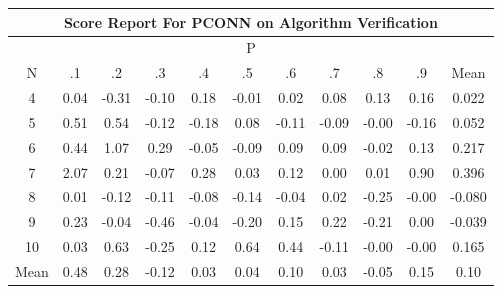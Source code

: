 \documentclass[11pt,a4paper]{report}
\begin{document}
\begin{longtable}{ | c || c | c | c | c | c | c | c | c | c || c |}
\hline
\multicolumn{11}{|c|}{ Score Report For PCONN on Algorithm Verification} \\
\hline
\multicolumn{11}{|c|}{ P } \\
\hline
N & .1 & .2 & .3 & .4 & .5 & .6 & .7 & .8 & .9 & Mean\\
 \hline
 \hline
 \endhead
  4 &  \cellcolor[HTML]{FFFFFF} 0.04 &  \cellcolor[HTML]{FFF7F7} -0.31 &  \cellcolor[HTML]{FFFFFF} -0.10 &  \cellcolor[HTML]{F7F7FF} 0.18 &  \cellcolor[HTML]{FFFFFF} -0.01 &  \cellcolor[HTML]{FFFFFF} 0.02 &  \cellcolor[HTML]{FFFFFF} 0.08 &  \cellcolor[HTML]{FFFFFF} 0.13 &  \cellcolor[HTML]{F7F7FF} 0.16 & 0.022 \\
  5 &  \cellcolor[HTML]{EFEFFF} 0.51 &  \cellcolor[HTML]{EFEFFF} 0.54 &  \cellcolor[HTML]{FFFFFF} -0.12 &  \cellcolor[HTML]{FFF7F7} -0.18 &  \cellcolor[HTML]{FFFFFF} 0.08 &  \cellcolor[HTML]{FFFFFF} -0.11 &  \cellcolor[HTML]{FFFFFF} -0.09 &  \cellcolor[HTML]{FFFFFF} -0.00 &  \cellcolor[HTML]{FFF7F7} -0.16 & 0.052 \\
  6 &  \cellcolor[HTML]{F7F7FF} 0.44 &  \cellcolor[HTML]{E7E7FF} 1.07 &  \cellcolor[HTML]{F7F7FF} 0.29 &  \cellcolor[HTML]{FFFFFF} -0.05 &  \cellcolor[HTML]{FFFFFF} -0.09 &  \cellcolor[HTML]{FFFFFF} 0.09 &  \cellcolor[HTML]{FFFFFF} 0.09 &  \cellcolor[HTML]{FFFFFF} -0.02 &  \cellcolor[HTML]{FFFFFF} 0.13 & 0.217 \\
  7 &  \cellcolor[HTML]{C7C7FF} 2.07 &  \cellcolor[HTML]{F7F7FF} 0.21 &  \cellcolor[HTML]{FFFFFF} -0.07 &  \cellcolor[HTML]{F7F7FF} 0.28 &  \cellcolor[HTML]{FFFFFF} 0.03 &  \cellcolor[HTML]{FFFFFF} 0.12 &  \cellcolor[HTML]{FFFFFF} 0.00 &  \cellcolor[HTML]{FFFFFF} 0.01 &  \cellcolor[HTML]{E7E7FF} 0.90 & 0.396 \\
  8 &  \cellcolor[HTML]{FFFFFF} 0.01 &  \cellcolor[HTML]{FFFFFF} -0.12 &  \cellcolor[HTML]{FFFFFF} -0.11 &  \cellcolor[HTML]{FFFFFF} -0.08 &  \cellcolor[HTML]{FFFFFF} -0.14 &  \cellcolor[HTML]{FFFFFF} -0.04 &  \cellcolor[HTML]{FFFFFF} 0.02 &  \cellcolor[HTML]{FFF7F7} -0.25 &  \cellcolor[HTML]{FFFFFF} -0.00 & -0.080 \\
  9 &  \cellcolor[HTML]{F7F7FF} 0.23 &  \cellcolor[HTML]{FFFFFF} -0.04 &  \cellcolor[HTML]{FFF7F7} -0.46 &  \cellcolor[HTML]{FFFFFF} -0.04 &  \cellcolor[HTML]{FFF7F7} -0.20 &  \cellcolor[HTML]{FFFFFF} 0.15 &  \cellcolor[HTML]{F7F7FF} 0.22 &  \cellcolor[HTML]{FFF7F7} -0.21 &  \cellcolor[HTML]{FFFFFF} 0.00 & -0.039 \\
  10 &  \cellcolor[HTML]{FFFFFF} 0.03 &  \cellcolor[HTML]{EFEFFF} 0.63 &  \cellcolor[HTML]{FFF7F7} -0.25 &  \cellcolor[HTML]{FFFFFF} 0.12 &  \cellcolor[HTML]{EFEFFF} 0.64 &  \cellcolor[HTML]{F7F7FF} 0.44 &  \cellcolor[HTML]{FFFFFF} -0.11 &  \cellcolor[HTML]{FFFFFF} -0.00 &  \cellcolor[HTML]{FFFFFF} -0.00 & 0.165 \\
 \hline
 \hline
Mean &  \cellcolor[HTML]{F7F7FF} 0.48 &  \cellcolor[HTML]{F7F7FF} 0.28 &  \cellcolor[HTML]{FFFFFF} -0.12 &  \cellcolor[HTML]{FFFFFF} 0.03 &  \cellcolor[HTML]{FFFFFF} 0.04 &  \cellcolor[HTML]{FFFFFF} 0.10 &  \cellcolor[HTML]{FFFFFF} 0.03 &  \cellcolor[HTML]{FFFFFF} -0.05 &  \cellcolor[HTML]{FFFFFF} 0.15 &  \cellcolor[HTML]{FFFFFF} 0.10
\end{longtable}
\end{document}
